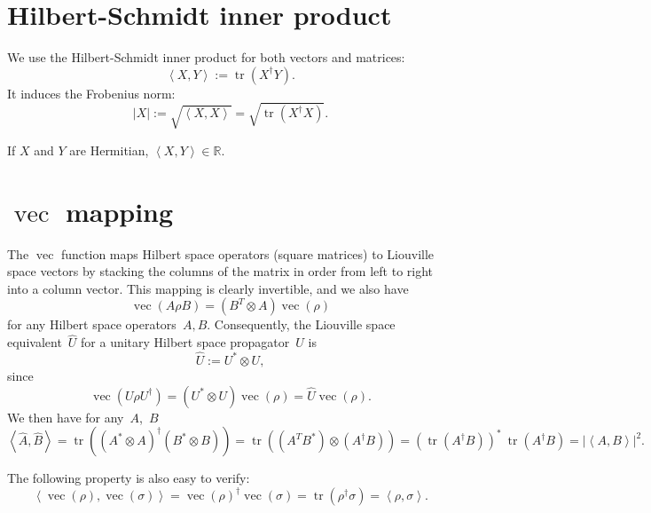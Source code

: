 \documentclass[aps, pra, a4paper, longbibliography]{revtex4}
\newcommand{\be}{\begin{equation}}
\newcommand{\ee}{\end{equation}}
\newcommand{\R}{{\mathbb R}}  %
\newcommand{\inprod}[2]{\left\langle #1, #2 \right\rangle}
\DeclareMathOperator{\tr}{tr}
\DeclareMathOperator{\cvec}{vec}
\begin{document}
\appendix
\section{Hilbert-Schmidt inner product}

We use the Hilbert-Schmidt inner product for both vectors and matrices:
\be
\inprod{X}{Y} := \tr\left(X^\dagger Y\right).
\ee
It induces the Frobenius norm:
\be
|X| := \sqrt{\inprod{X}{X}} = \sqrt{\tr\left(X^\dagger X\right)}.
\ee

If $X$ and $Y$ are Hermitian, $\inprod{X}{Y} \in \R$.

\section{$\cvec$ mapping}
\label{sec:vec}

The $\cvec$ function maps Hilbert space operators (square matrices) to
Liouville space vectors by stacking the columns of the matrix in order
from left to right into a column vector. This mapping is clearly
invertible, and we also have
\be
\cvec(A \rho B) = (B^T \otimes A) \cvec(\rho)
\ee
for any Hilbert space operators~$A, B$.
Consequently, the Liouville space equivalent~$\hat{U}$ for a unitary Hilbert space
propagator~$U$ is
\be
\label{eq:L-unitary}
\hat{U} := U^* \otimes U,
\ee
since
\be
\cvec(U \rho U^\dagger) = (U^* \otimes U) \cvec(\rho) = \hat{U} \cvec(\rho).
\ee
We then have for any~$A$,~$B$
\be
\label{eq:hat-product}
\inprod{\hat{A}}{\hat{B}}
= \tr((A^* \otimes A)^\dagger (B^* \otimes B))
= \tr((A^T B^*) \otimes (A^\dagger B))
= (\tr(A^\dagger B))^* \: \tr(A^\dagger B)
= |\inprod{A}{B}|^2.
\ee

The following property is also easy to verify:
\be
\inprod{\cvec(\rho)}{\cvec(\sigma)} = \cvec(\rho)^\dagger \cvec(\sigma)
= \tr(\rho^\dagger \sigma) = \inprod{\rho}{\sigma}.
\ee






\end{document}
